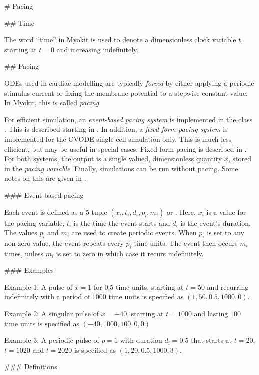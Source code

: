# Pacing

## Time

The word ``time'' in Myokit is used to denote a dimensionless clock variable
 $t$, starting at $t=0$ and increasing indefinitely.

## Pacing

ODEs used in cardiac modelling are typically \emph{forced} by either applying a
 periodic stimulus current or fixing the membrane potential to a stepwise
 constant value.
In Myokit, this is called \emph{pacing}.

For efficient simulation, an \emph{event-based pacing system} is implemented
 in the class .
This is described starting in .
In addition, a \emph{fixed-form pacing system} is implemented for the CVODE
 single-cell simulation only.
This is much less efficient, but may be useful in special cases.
Fixed-form pacing is described in .
For both systems, the output is a single valued, dimensionless quantity $x$,
 stored in the \emph{pacing variable}.
Finally, simulations can be run without pacing.
Some notes on this are given in .

### Event-based pacing

Each event is defined as a 5-tuple $(x_i, t_i, d_i, p_i, m_i)$ or
 .
Here, \emph{$x_i$} is a value for the pacing variable, $t_i$ is the time the
 event starts and $d_i$ is the event's duration.
The values $p_i$ and $m_i$ are used to create periodic events.
When $p_i$ is set to any non-zero value, the event repeats every $p_i$ time
 units.
The event then occurs $m_i$ times, unless $m_i$ is set to zero in which case
 it recurs indefinitely.

### Examples

Example 1: A pulse of $x=1$ for $0.5$ time units, starting at $t=50$ and
 recurring indefinitely with a period of $1000$ time units is specified as
 $(1, 50, 0.5, 1000, 0)$.

Example 2: A singular pulse of $x=-40$, starting at $t=1000$ and lasting
 $100$ time units is specified as $(-40, 1000, 100, 0, 0)$

Example 3: A periodic pulse of $p=1$ with duration $d_i=0.5$ that starts at
 $t=20$, $t=1020$ and $t=2020$ is specified as $(1, 20, 0.5, 1000, 3)$.

### Definitions

